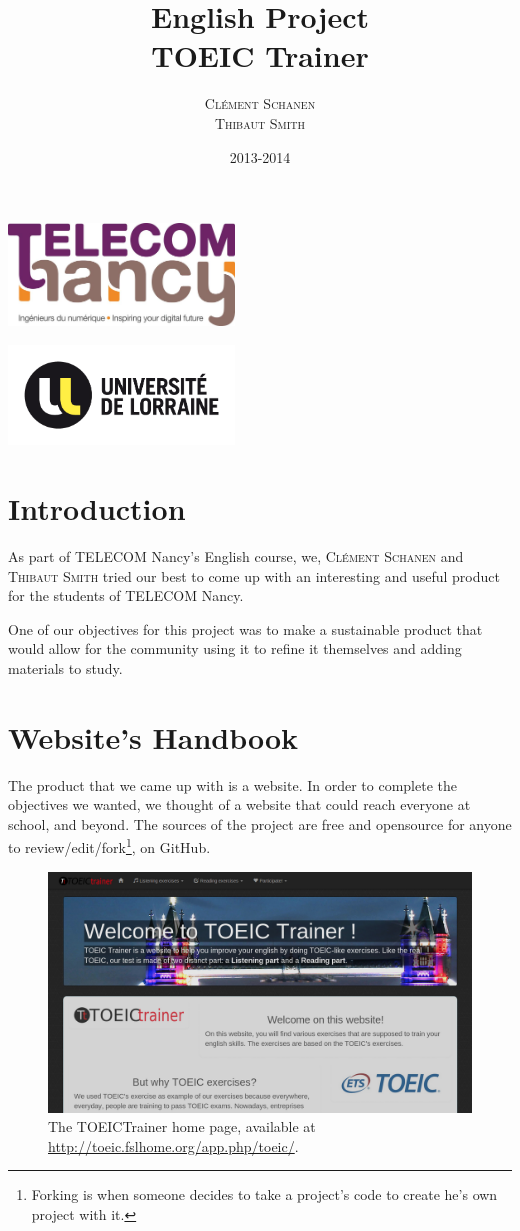 \documentclass[12pt,a4paper]{report}
\title{English Project \\ \textbf{TOEIC Trainer}}
\author{\textsc{Clément Schanen} \\ \textsc{Thibaut Smith}}
\date{2013-2014}
\makeatletter
\def\maketitle{
\begin{minipage}{0.54\textwidth}
\begin{flushleft} \large
\LARGE \@author
\end{flushleft}
\end{minipage}
\begin{minipage}{0.4\textwidth}
\begin{flushright} \large
\end{flushright}
\end{minipage}
  \vfill
  \begin{center}\leavevmode
    \normalfont
    {\LARGE \@title\par}%
    {\Large \@date\par}
    \vskip 1cm
  \end{center}%
  \vfill
  \hfill
  
\begin{minipage}{0.54\textwidth}
\begin{flushleft} \large
\includegraphics[width=6cm]{telecomnancy.jpg}


\end{flushleft}
\end{minipage}
\begin{minipage}{0.4\textwidth}
\begin{flushright} \large
\includegraphics[width=6cm]{univ-lorraine.jpg}
\end{flushright}
\end{minipage}
  \cleardoublepage
  }
\makeatother
\begin{document}
\pagestyle{empty} %

\maketitle %

\pagestyle{plain}
\setcounter{page}{2}

\tableofcontents
\section*{Introduction}
As part of TELECOM Nancy's English course, we, \textsc{Clément Schanen} and
\textsc{Thibaut Smith} tried our best to come up with an interesting and
useful product for the students of TELECOM Nancy.

One of our objectives for this project was to make a sustainable product that
would allow for the community using it to refine it themselves and adding
materials to study.

\pagebreak
\section{Website's Handbook}

The product that we came up with is a website\cite{TOEICTrainer}. In order to
complete the objectives we wanted, we thought of a website that could reach
everyone at school, and beyond. The sources of the project are free and
opensource for anyone to review/edit/fork\footnote{Forking is when someone
decides to take a project's code to create he's own project with it.}, on
GitHub\cite{github_tc}.

\begin{figure}[here]
\includegraphics[scale=0.35]{homepage.png}
\caption{The TOEICTrainer home page\cite{TOEICTrainer}, available at \url{http://toeic.fslhome.org/app.php/toeic/}.}
\label{homepage}
\end{figure}
\end{document}

